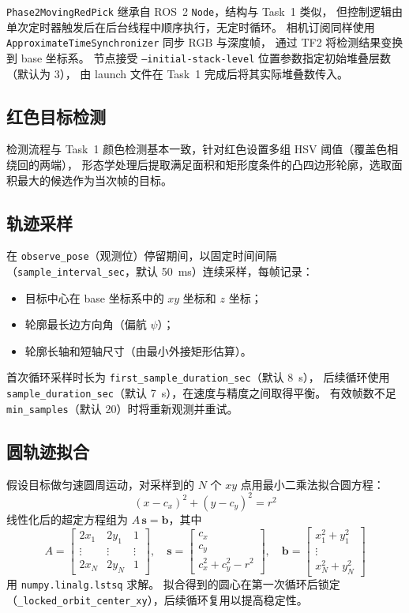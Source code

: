 \documentclass[12pt,a4paper]{article}
\begin{document}
\texttt{Phase2MovingRedPick} 继承自 ROS~2 \texttt{Node}，结构与 Task~1 类似，
但控制逻辑由单次定时器触发后在后台线程中顺序执行，无定时循环。
相机订阅同样使用 \texttt{ApproximateTimeSynchronizer} 同步 RGB 与深度帧，
通过 TF2 将检测结果变换到 base 坐标系。
节点接受 \texttt{--initial-stack-level} 位置参数指定初始堆叠层数（默认为 3），
由 launch 文件在 Task~1 完成后将其实际堆叠数传入。

\subsection{红色目标检测}

检测流程与 Task~1 颜色检测基本一致，针对红色设置多组 HSV 阈值（覆盖色相绕回的两端），
形态学处理后提取满足面积和矩形度条件的凸四边形轮廓，选取面积最大的候选作为当次帧的目标。

\subsection{轨迹采样}

在 \texttt{observe\_pose}（观测位）停留期间，以固定时间间隔（\texttt{sample\_interval\_sec}，默认 50~ms）连续采样，每帧记录：
\begin{itemize}[noitemsep]
  \item 目标中心在 base 坐标系中的 $xy$ 坐标和 $z$ 坐标；
  \item 轮廓最长边方向角（偏航 $\psi$）；
  \item 轮廓长轴和短轴尺寸（由最小外接矩形估算）。
\end{itemize}

首次循环采样时长为 \texttt{first\_sample\_duration\_sec}（默认 8~s），
后续循环使用 \texttt{sample\_duration\_sec}（默认 7~s），在速度与精度之间取得平衡。
有效帧数不足 \texttt{min\_samples}（默认 20）时将重新观测并重试。

\subsection{圆轨迹拟合}

假设目标做匀速圆周运动，对采样到的 $N$ 个 $xy$ 点用最小二乘法拟合圆方程：
\begin{equation}
  (x - c_x)^2 + (y - c_y)^2 = r^2
  \label{eq:circle}
\end{equation}
线性化后的超定方程组为 $A\,\bm{s} = \bm{b}$，其中
\[
  A = \begin{bmatrix} 2x_1 & 2y_1 & 1 \\ \vdots & \vdots & \vdots \\ 2x_N & 2y_N & 1 \end{bmatrix},\quad
  \bm{s} = \begin{bmatrix} c_x \\ c_y \\ c_x^2 + c_y^2 - r^2 \end{bmatrix},\quad
  \bm{b} = \begin{bmatrix} x_1^2 + y_1^2 \\ \vdots \\ x_N^2 + y_N^2 \end{bmatrix}
\]
用 \texttt{numpy.linalg.lstsq} 求解。
拟合得到的圆心在第一次循环后锁定（\texttt{\_locked\_orbit\_center\_xy}），后续循环复用以提高稳定性。
\end{document}
